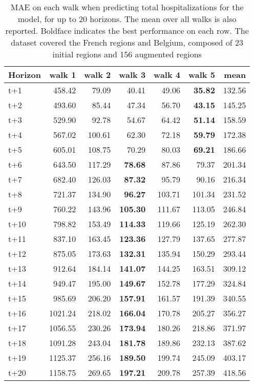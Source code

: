 \begin{table}[H]
\centering
\caption{MAE on each walk when predicting total hospitalizations for the model, for up to 20 horizons. The mean over all walks is also reported. Boldface indicates the best performance on each row. The dataset covered the French regions and Belgium, composed of 23 initial regions and 156 augmented regions }
\label{tab:MAE_walk_custom_linear_regression}
\begin{tabular}{lrrrrrr}
\toprule
Horizon &  walk 1 &  walk 2 &  walk 3 &  walk 4 &  walk 5 &   mean \\
\midrule
t+1  & 458.42  & 79.09  & 40.41  & 49.06  & \textbf{35.82}  & 132.56  \\
t+2  & 493.60  & 85.44  & 47.34  & 56.70  & \textbf{43.15}  & 145.25  \\
t+3  & 529.90  & 92.78  & 54.67  & 64.42  & \textbf{51.14}  & 158.59  \\
t+4  & 567.02  & 100.61  & 62.30  & 72.18  & \textbf{59.79}  & 172.38  \\
t+5  & 605.01  & 108.75  & 70.29  & 80.03  & \textbf{69.21}  & 186.66  \\
t+6  & 643.50  & 117.29  & \textbf{78.68}  & 87.86  & 79.37  & 201.34  \\
t+7  & 682.40  & 126.03  & \textbf{87.32}  & 95.79  & 90.16  & 216.34  \\
t+8  & 721.37  & 134.90  & \textbf{96.27}  & 103.71  & 101.34  & 231.52  \\
t+9  & 760.22  & 143.96  & \textbf{105.30}  & 111.67  & 113.05  & 246.84  \\
t+10  & 798.82  & 153.49  & \textbf{114.33}  & 119.66  & 125.19  & 262.30  \\
t+11  & 837.10  & 163.45  & \textbf{123.36}  & 127.79  & 137.65  & 277.87  \\
t+12  & 875.05  & 173.63  & \textbf{132.31}  & 135.94  & 150.29  & 293.44  \\
t+13  & 912.64  & 184.14  & \textbf{141.07}  & 144.25  & 163.51  & 309.12  \\
t+14  & 949.47  & 195.00  & \textbf{149.67}  & 152.78  & 177.29  & 324.84  \\
t+15  & 985.69  & 206.20  & \textbf{157.91}  & 161.57  & 191.39  & 340.55  \\
t+16  & 1021.24  & 218.02  & \textbf{166.04}  & 170.78  & 205.27  & 356.27  \\
t+17  & 1056.55  & 230.26  & \textbf{173.94}  & 180.26  & 218.86  & 371.97  \\
t+18  & 1091.28  & 243.04  & \textbf{181.78}  & 189.86  & 232.13  & 387.62  \\
t+19  & 1125.37  & 256.16  & \textbf{189.50}  & 199.74  & 245.09  & 403.17  \\
t+20  & 1158.75  & 269.65  & \textbf{197.21}  & 209.78  & 257.39  & 418.56  \\

\bottomrule
\end{tabular}
\end{table}
